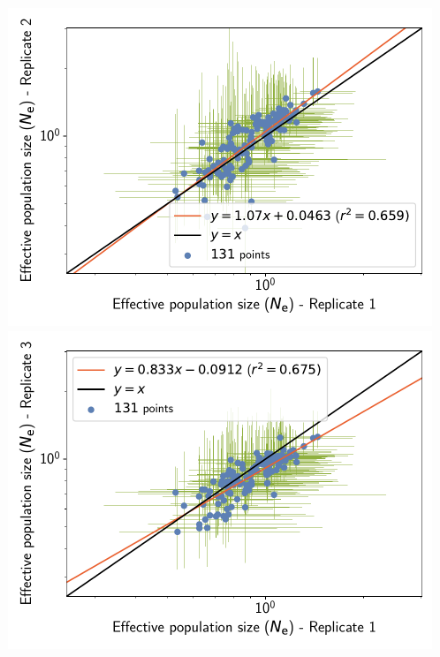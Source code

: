 \documentclass{article}
\begin{document}
	\begin{figure}[H]
		\centering
		\begin{minipage}{0.32\linewidth}
			\includegraphics[width=\linewidth, page=1]{isopods/12CDS_SiteMutSelBranchNe_Rep-1-2_LogPopulationSize}
		\end{minipage} \hfill
		\begin{minipage}{0.32\linewidth}
			\includegraphics[width=\linewidth, page=1]{isopods/12CDS_SiteMutSelBranchNe_Rep-1-3_LogPopulationSize}
		\end{minipage} \hfill
		\begin{minipage}{0.32\linewidth}

\end{minipage}
\end{figure}
\end{document}
